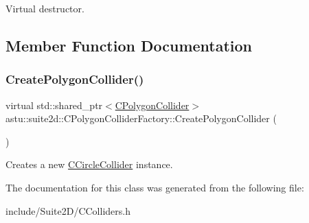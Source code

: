 Virtual destructor. 

\subsection{Member Function Documentation}
\mbox{\label{classastu_1_1suite2d_1_1CPolygonColliderFactory_a29ecb824aa282ce5c6d64111d9bfd65f}} 
\subsubsection{\texorpdfstring{Create\+Polygon\+Collider()}{CreatePolygonCollider()}}
{\footnotesize\ttfamily virtual std\+::shared\+\_\+ptr$<$\hyperlink{classastu_1_1suite2d_1_1CPolygonCollider}{C\+Polygon\+Collider}$>$ astu\+::suite2d\+::\+C\+Polygon\+Collider\+Factory\+::\+Create\+Polygon\+Collider (\begin{DoxyParamCaption}{ }\end{DoxyParamCaption})\hspace{0.3cm}{\ttfamily [pure virtual]}}

Creates a new \hyperlink{classastu_1_1suite2d_1_1CCircleCollider}{C\+Circle\+Collider} instance. 

The documentation for this class was generated from the following file\+:\begin{DoxyCompactItemize}
\item 
include/\+Suite2\+D/C\+Colliders.\+h\end{DoxyCompactItemize}
